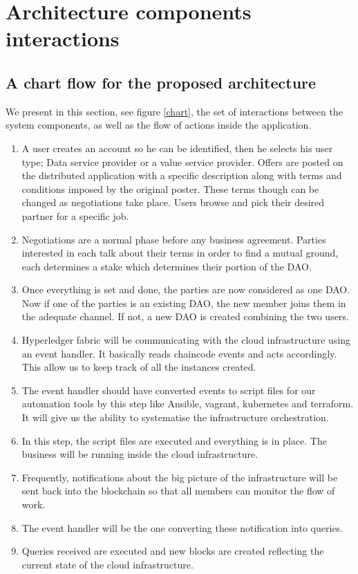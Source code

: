 \documentclass[conference]{IEEEtran}
\begin{document}
\section{Architecture components interactions}
\subsection{A chart flow for the proposed architecture}
              We present in this section, see figure \ref{chart}, the set of interactions between the system components, as well as the flow of actions inside the application.
       \begin{enumerate}

\item A user creates an account so he can be identified, then he selects his user type; Data service provider or a value service provider. Offers are posted on the distributed application with a specific description along with terms and conditions imposed by the original poster. These terms though can be changed as negotiations take place. Users browse and pick their desired partner for a specific job.

\item Negotiations are a normal phase before any business agreement. Parties interested in each talk about their terms in order to find a mutual ground, each determines a stake which determines their portion of the DAO. 

\item Once everything is set and done, the parties are now considered as one DAO. Now if one of the parties is an existing DAO, the new member joins them in the adequate channel. If not, a new DAO is created combining the two users. 

\item Hyperledger fabric will be communicating with the cloud infrastructure using an event handler. It basically reads chaincode events and acts accordingly. This allow us to keep track of all the instances created.

\item The event handler should have converted events to script files for our automation tools by this step like Ansible, vagrant, kubernetes and terraform. It will give us the ability to systematise the infrastructure orchestration.
\item In this step, the script files are executed and everything is in place. The business will be running inside the cloud infrastructure.
\item Frequently, notifications about the big picture of the infrastructure will be sent back into the blockchain so that all members can monitor the flow of work.

\item The event handler will be the one converting these notification into queries. 

\item Queries received are executed and new blocks are created reflecting the current state of the cloud infrastructure.
       \end{enumerate}
\end{document}
